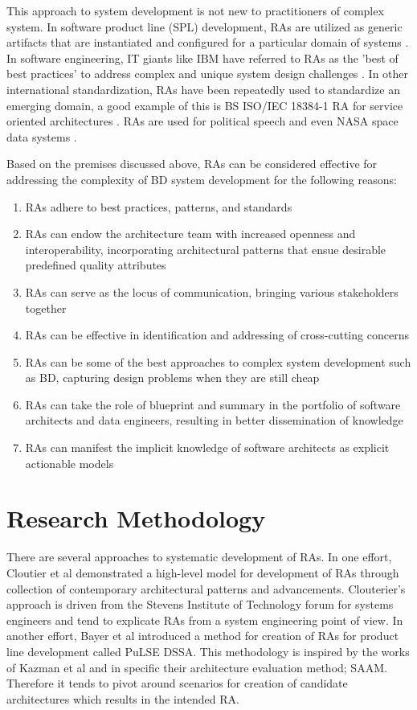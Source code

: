 \documentclass[runningheads]{llncs}
\begin{document}
This approach to system development is not new to practitioners of complex system. In software product line (SPL) development, RAs are utilized as generic artifacts that are instantiated and configured for a particular domain of systems \cite{Derras}. In software engineering, IT giants like IBM have referred to RAs as the 'best of best practices' to address complex and unique system design challenges \cite{Cloutier}. In other international standardization, RAs have been repeatedly used to standardize an emerging domain, a good example of this is BS ISO/IEC 18384-1 RA \cite{} for service oriented architectures \cite{Iso18384-1}. RAs are used for political speech and even NASA space data systems \cite{NASA}.

Based on the premises discussed above, RAs can be considered effective for addressing the complexity of BD system development for the following reasons: 

\begin{enumerate}
    \item RAs adhere to best practices, patterns, and standards
    \item RAs can endow the architecture team with increased openness and interoperability, incorporating architectural patterns that ensue desirable predefined quality attributes 
    \item RAs can serve as the locus of communication, bringing various stakeholders together
    \item RAs can be effective in identification and addressing of cross-cutting concerns 
    \item RAs can be some of the best approaches to complex system development such as BD, capturing design problems when they are still cheap 
    \item RAs can take the role of blueprint and summary in the portfolio of software architects and data engineers, resulting in better dissemination of knowledge 
    \item RAs can manifest the implicit knowledge of software architects as explicit actionable models
\end{enumerate}

\section{Research Methodology}
There are several approaches to systematic development of RAs. In one effort, Cloutier et al \cite{Cloutier} demonstrated a high-level model for development of RAs through collection of contemporary architectural patterns and advancements. Clouterier's approach is driven from the Stevens Institute of Technology forum for systems engineers and tend to explicate RAs from a system engineering point of view. In another effort, Bayer et al \cite{bayer1999pulse} introduced a method for creation of RAs for product line development called PuLSE DSSA. This methodology is inspired by the works of Kazman et al \cite{kazman1994saam} and in specific their architecture evaluation method; SAAM. Therefore it tends to pivot around scenarios for creation of candidate architectures which results in the intended RA. 
\end{document}
